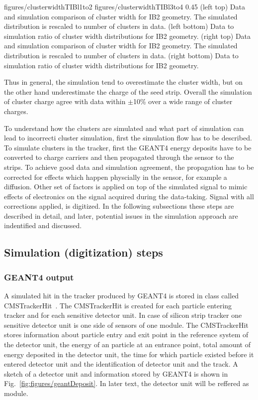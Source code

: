                  {figures/clusterwidthTIBl1to2}
                 {figures/clusterwidthTIBl3to4} %
                 {0.45}       %
                 {(left top) Data and simulation  comparison of cluster width for IB2 geometry. The simulated distribution is rescaled to number of clusters in data. (left bottom) Data to simulation ratio of cluster width distributions for IB2 geometry. (right top) Data and simulation  comparison of cluster width for IB2 geometry. The simulated distribution is rescaled to number of clusters in data. (right bottom) Data to simulation ratio of cluster width distributions for IB2 geometry. }


Thus in general, the simulation tend to overestimate the cluster width, but on the other hand underestimate the charge of the seed strip. Overall the simulation of cluster charge agree with data within $\pm$10\% over a wide range of cluster charges.

To understand how the clusters are simulated and what part of simulation can lead to incorrecti cluster simulation, first the simulation flow has to be described. To simulate clusters in the tracker, first the GEANT4 energy deposits have to be converted to charge carriers and then propagated through the sensor to the strips. To achieve good data and simulation agreement, the propagation has to be corrected for effects which happen physcially in the sensor, for example a diffusion. Other set of factors is applied on top of the simulated signal to mimic effects of electronics on the signal acquired during the data-taking. Signal with all corrections applied, is digitized. In the following subsections these steps are described in detail, and later, potential issues in the simulation approach are indentified and discussed.


\subsection{Simulation (digitization) steps}

\subsubsection{GEANT4 output}

A simulated hit in the tracker produced by GEANT4 is stored in class called CMSTrackerHit~\cite{Lefebure:1364020}. The CMSTrackerHit is created for each particle entering tracker and for each sensitive detector unit. In case of silicon strip tracker one sensitive detector unit is one side of sensors of one module. The CMSTrackerHit stores information about particle entry and exit point in the reference system of the detector unit, the energy of an particle at an entrance point, total amount of energy deposited in the detector unit, the time for which particle existed before it entered detector unit and the identification of detector unit and the track. A sketch of a detector unit and information stored by GEANT4 is shown in Fig.~\ref{fig:figures/geantDeposit}. In later text, the detector unit will be reffered as module.

